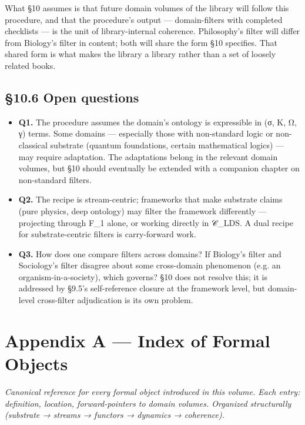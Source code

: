 \documentclass[11pt, openany]{book}
\newcommand{\sectionbreak}{\clearpage}
\begin{document}
What §10 assumes is that future domain volumes of the library will follow this procedure, and that the procedure's output --- domain-filters with completed checklists --- is the unit of library-internal coherence. Philosophy's filter will differ from Biology's filter in content; both will share the form §10 specifies. That shared form is what makes the library a library rather than a set of loosely related books.

\sectionbreak

\section{§10.6 Open questions}

\begin{itemize}
\item \textbf{Q1.} The procedure assumes the domain's ontology is expressible in (σ, K, Ω, γ) terms. Some domains --- especially those with non-standard logic or non-classical substrate (quantum foundations, certain mathematical logics) --- may require adaptation. The adaptations belong in the relevant domain volumes, but §10 should eventually be extended with a companion chapter on non-standard filters.
\item \textbf{Q2.} The recipe is stream-centric; frameworks that make substrate claims (pure physics, deep ontology) may filter the framework differently --- projecting through F\_\allowbreak{}1 alone, or working directly in 𝒞\_\allowbreak{}LDS. A dual recipe for substrate-centric filters is carry-forward work.
\item \textbf{Q3.} How does one compare filters across domains? If Biology's filter and Sociology's filter disagree about some cross-domain phenomenon (e.g. an organism-in-a-society), which governs? §10 does not resolve this; it is addressed by §9.5's self-reference closure at the framework level, but domain-level cross-filter adjudication is its own problem.
\end{itemize}

\chapter{Appendix A — Index of Formal Objects}


\textit{Canonical reference for every formal object introduced in this volume. Each entry: definition, location, forward-pointers to domain volumes. Organized structurally (substrate → streams → functors → dynamics → coherence).}
\end{document}

